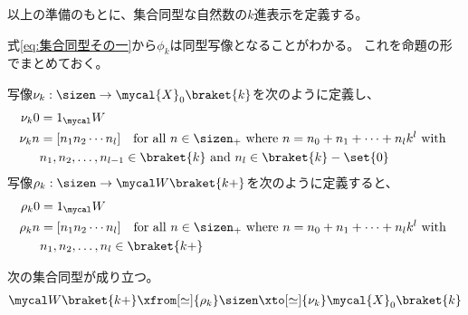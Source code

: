 	以上の準備のもとに、集合同型な自然数の$k$進表示を定義する。

	式\eqref{eq:集合同型その一}から$\phi_k$は同型写像となることがわかる。
	これを命題の形でまとめておく。

	\begin{proposition}[集合同型となるk進表示]
	\label{prop:集合同型となるk進表示} %
		写像$\nu_k:\sizen\to\mycal{X}_0\braket{k}$を次のように定義し、
		\begin{equation*}\begin{split}
			\nu_k0 &= 1_\Word \\
			\nu_kn &= [n_1n_2\cdots n_l] \quad\text{for all }n\in\sizen_+
			\text{ where } n = n_0 + n_1 + \cdots + n_lk^l \text{ with } \\
			& n_1,n_2,\dots,n_{l-1}\in\braket{k}\text{ and } n_l\in\braket{k}-\set{0}
		\end{split}\end{equation*}
		写像$\rho_k:\sizen\to\Word\braket{k+}$を次のように定義すると、
		\begin{equation*}\begin{split}
			\rho_k0 &= 1_\Word \\
			\rho_kn &= [n_1n_2\cdots n_l] \quad\text{for all }n\in\sizen_+
			\text{ where } n = n_0 + n_1 + \cdots + n_lk^l \text{ with } \\
			& n_1,n_2,\dots,n_l\in\braket{k+}
		\end{split}\end{equation*}

		次の集合同型が成り立つ。
		\begin{equation*}\begin{split}
			\Word\braket{k+} \xfrom[\simeq]{\rho_k} \sizen
			\xto[\simeq]{\nu_k} \mycal{X}_0\braket{k}
		\end{split}\end{equation*}
	\end{proposition} %

	\begin{todo}[ここまで]\label{todo:ここまで} %
	\end{todo} %

